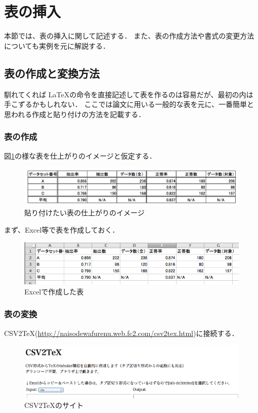 \section{表の挿入}
本節では、表の挿入に関して記述する．
また、表の作成方法や書式の変更方法についても実例を元に解説する．

\subsection{表の作成と変換方法}
馴れてくれば \LaTeX の命令を直接記述して表を作るのは容易だが、最初の内は手こずるかもしれない．
ここでは論文に用いる一般的な表を元に、一番簡単と思われる作成と貼り付けの方法を記載する．

\subsubsection{表の作成}
図\ref{fig:tableFinish}の様な表を仕上がりのイメージと仮定する．
\begin{figure}[H]
\centering
\includegraphics[width=14cm]{tableFinishImage.png}
\vspace{-3mm}
\caption{貼り付けたい表の仕上がりのイメージ}
\label{fig:tableFinish}
\end{figure}

まず、Excel等で表を作成しておく．
\begin{figure}[H]
\centering
\includegraphics[width=14cm]{excelTable.png}
\vspace{-3mm}
\caption{Excelで作成した表}
\label{fig:excelTable}
\end{figure}

\subsubsection{表の変換}
CSV2TeX(\url{http://naisodewafurenu.web.fc2.com/csv2tex.html})に接続する．
\begin{figure}[H]
\centering
\includegraphics[width=12cm]{csv2tex.png}
\vspace{-3mm}
\caption{CSV2TeXのサイト}
\label{fig:csv2tex}
\end{figure}

